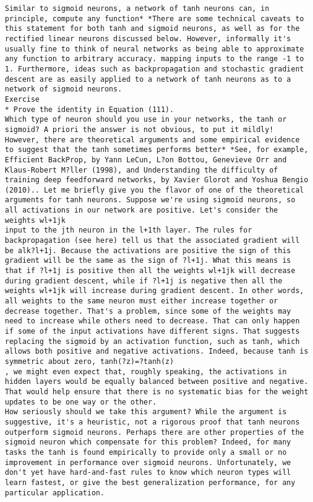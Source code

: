 \begin{lstlisting}
Similar to sigmoid neurons, a network of tanh neurons can, in principle, compute any function* *There are some technical caveats to this statement for both tanh and sigmoid neurons, as well as for the rectified linear neurons discussed below. However, informally it's usually fine to think of neural networks as being able to approximate any function to arbitrary accuracy. mapping inputs to the range -1 to 1. Furthermore, ideas such as backpropagation and stochastic gradient descent are as easily applied to a network of tanh neurons as to a network of sigmoid neurons.
Exercise
* Prove the identity in Equation (111). 
Which type of neuron should you use in your networks, the tanh or sigmoid? A priori the answer is not obvious, to put it mildly! However, there are theoretical arguments and some empirical evidence to suggest that the tanh sometimes performs better* *See, for example, Efficient BackProp, by Yann LeCun, L?on Bottou, Genevieve Orr and Klaus-Robert M?ller (1998), and Understanding the difficulty of training deep feedforward networks, by Xavier Glorot and Yoshua Bengio (2010).. Let me briefly give you the flavor of one of the theoretical arguments for tanh neurons. Suppose we're using sigmoid neurons, so all activations in our network are positive. Let's consider the weights wl+1jk
input to the jth neuron in the l+1th layer. The rules for backpropagation (see here) tell us that the associated gradient will be alk?l+1j. Because the activations are positive the sign of this gradient will be the same as the sign of ?l+1j. What this means is that if ?l+1j is positive then all the weights wl+1jk will decrease during gradient descent, while if ?l+1j is negative then all the weights wl+1jk will increase during gradient descent. In other words, all weights to the same neuron must either increase together or decrease together. That's a problem, since some of the weights may need to increase while others need to decrease. That can only happen if some of the input activations have different signs. That suggests replacing the sigmoid by an activation function, such as tanh, which allows both positive and negative activations. Indeed, because tanh is symmetric about zero, tanh(?z)=?tanh(z)
, we might even expect that, roughly speaking, the activations in hidden layers would be equally balanced between positive and negative. That would help ensure that there is no systematic bias for the weight updates to be one way or the other.
How seriously should we take this argument? While the argument is suggestive, it's a heuristic, not a rigorous proof that tanh neurons outperform sigmoid neurons. Perhaps there are other properties of the sigmoid neuron which compensate for this problem? Indeed, for many tasks the tanh is found empirically to provide only a small or no improvement in performance over sigmoid neurons. Unfortunately, we don't yet have hard-and-fast rules to know which neuron types will learn fastest, or give the best generalization performance, for any particular application.

\end{lstlisting}

